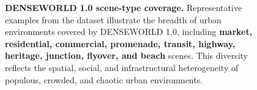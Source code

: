 \begin{figure}[t]
    \centering

    \hfill
    \hfill
    \hfill
    \hfill

    \vspace{-0.5em}

    \hfill
    \hfill
    \hfill
    \hfill

    \vspace{-1em}

    \caption{
        \textbf{DENSEWORLD 1.0 scene-type coverage.}
        Representative examples from the dataset illustrate the breadth of
        urban environments covered by DENSEWORLD 1.0, including
        \textbf{market, residential, commercial, promenade, transit,
        highway, heritage, junction, flyover, and beach} scenes.
        This diversity reflects the spatial, social, and infrastructural
        heterogeneity of populous, crowded, and chaotic urban environments.
    }
    \label{fig:denseworld_scene_coverage}
    \vspace{-1em}
\end{figure}






































































